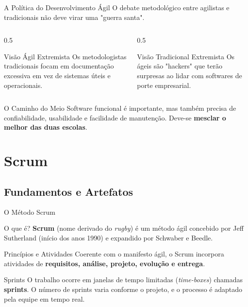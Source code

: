 \documentclass[aspectratio=169, 9pt]{beamer}
\begin{document}
\begin{frame}{A Política do Desenvolvimento Ágil}
  O debate metodológico entre agilistas e tradicionais não deve virar uma "guerra santa".
  
  \vspace{0.2cm}
  \begin{columns}
    \begin{column}{0.5\textwidth}
      \begin{block}{Visão Ágil Extremista}
        Os metodologistas tradicionais focam em documentação excessiva em vez de sistemas úteis e operacionais.
      \end{block}
    \end{column}
    \begin{column}{0.5\textwidth}
      \begin{alertblock}{Visão Tradicional Extremista}
        Os ágeis são "hackers" que terão surpresas ao lidar com softwares de porte empresarial.
      \end{alertblock}
    \end{column}
  \end{columns}

  \vspace{0.2cm}
  \begin{block}{O Caminho do Meio}
    Software funcional é importante, mas também precisa de confiabilidade, usabilidade e facilidade de manutenção. Deve-se \textbf{mesclar o melhor das duas escolas}.
  \end{block}
\end{frame}


\section{Scrum}

\subsection{Fundamentos e Artefatos}
\begin{frame}{O Método Scrum}
  \begin{block}{O que é?}
    \textbf{Scrum} (nome derivado do \textit{rugby}) é um método ágil concebido por Jeff Sutherland (início dos anos 1990) e expandido por Schwaber e Beedle.
  \end{block}

  \vspace{0.2cm}
  \begin{block}{Princípios e Atividades}
    Coerente com o manifesto ágil, o Scrum incorpora atividades de \textbf{requisitos, análise, projeto, evolução e entrega}.
  \end{block}

  \vspace{0.2cm}
  \begin{block}{Sprints}
    O trabalho ocorre em janelas de tempo limitadas (\textit{time-boxes}) chamadas \textbf{sprints}. O número de sprints varia conforme o projeto, e o processo é adaptado pela equipe em tempo real.
  \end{block}
\end{frame}
\end{document}
